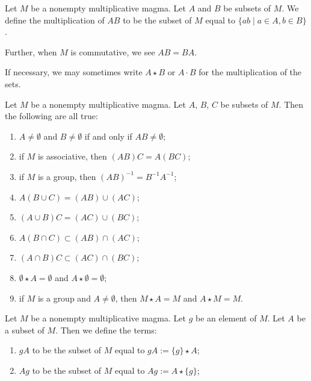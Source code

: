 \begin{definition}\label{def:group:group2:def2}
Let $M$ be a nonempty multiplicative magma. Let $A$ and $B$ be subsets of $M$.
We define the multiplication of $AB$ to be the subset of $M$ equal to
$\{ab\mid a\in A,b\in B\}$.

Further, when $M$ is commutative, we see $AB=BA$.

If necessary, we may sometimes write $A\star B$ or $A\cdot B$ for the
multiplication of the sets.
\end{definition}

\begin{theorem}
Let $M$ be a nonempty multiplicative magma.
Let $A$, $B$, $C$ be subsets of $M$. Then the following are all true:
\begin{enumerate}
\item $A\neq\emptyset$ and $B\neq\emptyset$ if and only if $AB\neq\emptyset$;
\item if $M$ is associative, then $(AB)C=A(BC)$;
\item if $M$ is a group, then $(AB)^{-1}=B^{-1}A^{-1}$;
\item $A(B\cup C)=(AB)\cup(AC)$;
\item $(A\cup B)C=(AC)\cup(BC)$;
\item $A(B\cap C)\subset(AB)\cap(AC)$;
\item $(A\cap B)C\subset(AC)\cap(BC)$;
\item $\emptyset\star A=\emptyset$ and $A\star\emptyset=\emptyset$;
\item if $M$ is a group and $A\neq\emptyset$, then $M\star A=M$ and
  $A\star M=M$.
\end{enumerate}
\end{theorem}

\begin{definition}
Let $M$ be a nonempty multiplicative magma.
Let $g$ be an element of $M$.
Let $A$ be a subset of $M$.
Then we define the terms:
\begin{enumerate}
\item $gA$ to be the subset of $M$ equal to $gA := \{g\}\star A$;
\item $Ag$ to be the subset of $M$ equal to $Ag := A\star\{g\}$;
\end{enumerate}
\end{definition}

